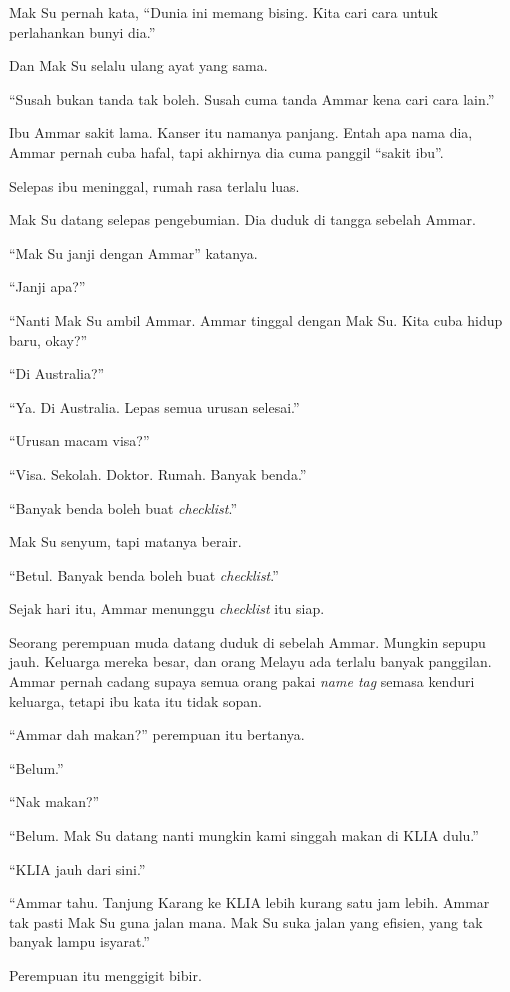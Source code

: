 \documentclass[
  11pt,
  a5paper,
  openany,
  oneside]{book}
\begin{document}
Mak Su pernah kata, ``Dunia ini memang bising. Kita cari cara untuk
perlahankan bunyi dia.''

Dan Mak Su selalu ulang ayat yang sama.

``Susah bukan tanda tak boleh. Susah cuma tanda Ammar kena cari cara
lain.''

Ibu Ammar sakit lama. Kanser itu namanya panjang. Entah apa nama dia,
Ammar pernah cuba hafal, tapi akhirnya dia cuma panggil ``sakit ibu''.

Selepas ibu meninggal, rumah rasa terlalu luas.

Mak Su datang selepas pengebumian. Dia duduk di tangga sebelah Ammar.

``Mak Su janji dengan Ammar'' katanya.

``Janji apa?''

``Nanti Mak Su ambil Ammar. Ammar tinggal dengan Mak Su. Kita cuba hidup
baru, okay?''

``Di Australia?''

``Ya. Di Australia. Lepas semua urusan selesai.''

``Urusan macam visa?''

``Visa. Sekolah. Doktor. Rumah. Banyak benda.''

``Banyak benda boleh buat \emph{checklist}.''

Mak Su senyum, tapi matanya berair.

``Betul. Banyak benda boleh buat \emph{checklist}.''

Sejak hari itu, Ammar menunggu \emph{checklist} itu siap.

Seorang perempuan muda datang duduk di sebelah Ammar. Mungkin sepupu
jauh. Keluarga mereka besar, dan orang Melayu ada terlalu banyak
panggilan. Ammar pernah cadang supaya semua orang pakai \emph{name tag}
semasa kenduri keluarga, tetapi ibu kata itu tidak sopan.

``Ammar dah makan?'' perempuan itu bertanya.

``Belum.''

``Nak makan?''

``Belum. Mak Su datang nanti mungkin kami singgah makan di KLIA dulu.''

``KLIA jauh dari sini.''

``Ammar tahu. Tanjung Karang ke KLIA lebih kurang satu jam lebih. Ammar
tak pasti Mak Su guna jalan mana. Mak Su suka jalan yang efisien, yang
tak banyak lampu isyarat.''

Perempuan itu menggigit bibir.
\end{document}
